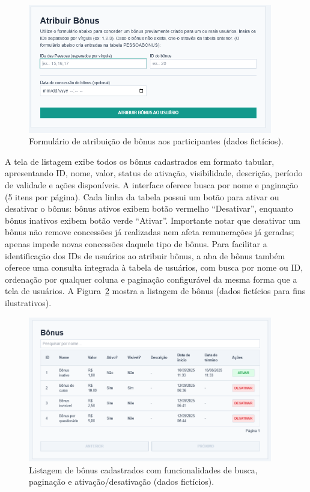  \begin{figure}[H]
   \centering
   \includegraphics[width=0.95\textwidth]{figuras/atribuir_bonus.PNG}
   \caption{Formulário de atribuição de bônus aos participantes (dados fictícios).}
   \label{fig:bonus_atribuir_form}
 \end{figure}

A tela de listagem exibe todos os bônus
cadastrados em formato tabular, apresentando ID, nome, valor, status de ativação,
visibilidade, descrição, período de validade e ações disponíveis. A interface
oferece busca por nome e paginação (5 itens por página). Cada linha da tabela
possui um botão para ativar ou desativar o bônus: bônus ativos exibem
botão vermelho ``Desativar'', enquanto bônus inativos exibem botão verde
``Ativar''. Importante notar que desativar um bônus não remove concessões já
realizadas nem afeta remunerações já geradas; apenas impede novas concessões
daquele tipo de bônus. Para facilitar a identificação dos IDs de usuários ao
atribuir bônus, a aba de bônus também oferece uma consulta integrada à tabela de
usuários, com busca por nome ou ID, ordenação por qualquer coluna e
paginação configurável da mesma forma que a tela de usuários. A Figura~\ref{fig:bonus_listagem_form} mostra a listagem de bônus (dados fictícios para fins ilustrativos).

\begin{figure}[H]
    \centering
    \includegraphics[width=0.95\textwidth]{figuras/bonus_listar.PNG}
    \caption{Listagem de bônus cadastrados com funcionalidades de busca, paginação e ativação/desativação (dados fictícios).}
    \label{fig:bonus_listagem_form}
  \end{figure}
 

